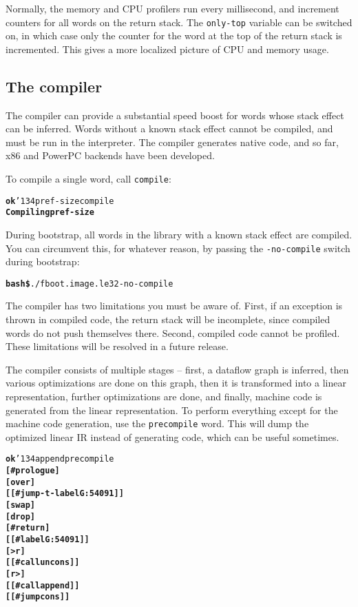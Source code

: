 \documentclass{book}
\newcommand{\bs}{\char'134}
\begin{document}
Normally, the memory and CPU profilers run every millisecond, and increment counters for all words on the return stack. The \texttt{only-top} variable can be switched on, in which case only the counter for the word at the top of the return stack is incremented. This gives a more localized picture of CPU and memory usage.

\subsection{\label{compiler}The compiler}

The compiler can provide a substantial speed boost for words whose stack effect can be inferred. Words without a known stack effect cannot be compiled, and must be run in the interpreter. The compiler generates native code, and so far, x86 and PowerPC backends have been developed.

To compile a single word, call \texttt{compile}:

\begin{alltt}
\textbf{ok} \bs pref-size compile
\textbf{Compiling pref-size}
\end{alltt}

During bootstrap, all words in the library with a known stack effect are compiled. You can
circumvent this, for whatever reason, by passing the \texttt{-no-compile} switch during
bootstrap:

\begin{alltt}
\textbf{bash\$} ./f boot.image.le32 -no-compile
\end{alltt}

The compiler has two limitations you must be aware of. First, if an exception is thrown in compiled code, the return stack will be incomplete, since compiled words do not push themselves there. Second, compiled code cannot be profiled. These limitations will be resolved in a future release.

The compiler consists of multiple stages -- first, a dataflow graph is inferred, then various optimizations are done on this graph, then it is transformed into a linear representation, further optimizations are done, and finally, machine code is generated from the linear representation. To perform everything except for the machine code generation, use the \texttt{precompile} word. This will dump the optimized linear IR instead of generating code, which can be useful sometimes.

\begin{alltt}
\textbf{ok} \bs append precompile
\textbf{[ \#prologue ]
[ over ]
[[ \#jump-t-label G:54091 ]]
[ swap ]
[ drop ]
[ \#return ]
[[ \#label G:54091 ]]
[ >r ]
[[ \#call uncons ]]
[ r> ]
[[ \#call append ]]
[[ \#jump cons ]]}
\end{alltt}

\printglossary


\end{document}
